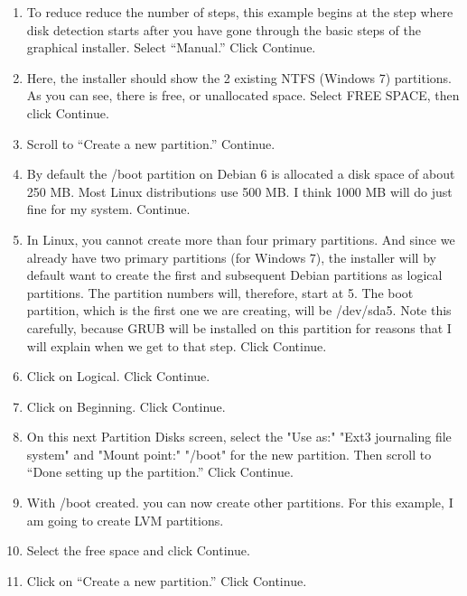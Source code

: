 \documentclass[12pt,notitlepage,onecolumn,oneside,openany]{memoir}
\begin{document}
\begin{enumerate}
\item \textsf{To reduce reduce the number of steps, this example begins at the step where disk detection starts after you have gone through the basic steps of the graphical installer. 
Select “Manual.”  Click Continue.}

\item \textsf{Here, the installer should show the 2 existing NTFS (Windows 7) partitions. As you can see, there is free, or unallocated space. Select FREE SPACE, then click Continue.}

\item \textsf{Scroll to “Create a new partition.” Continue.} 

\item \textsf{By default the /boot partition on Debian 6 is allocated a disk space of about 250 MB. Most Linux distributions use 500 MB. I think 1000 MB will do just fine for my system. Continue.}

\item \textsf{In Linux, you cannot create more than four primary partitions. And since we already have two primary partitions (for Windows 7), the installer will by default want to create the first and subsequent Debian partitions as logical partitions. The partition numbers will, therefore, start at 5. The boot partition, which is the first one we are creating, will be /dev/sda5. Note this carefully, because GRUB will be installed on this partition for reasons that I will explain when we get to that step. Click Continue.}

\item \textsf{Click on Logical. Click Continue.}

\item \textsf{Click on Beginning. Click Continue.} 

\item \textsf{On this next Partition Disks screen, select the "Use as:" "Ext3 journaling file system" and "Mount point:" "/boot" for the new partition. Then scroll to “Done setting up the partition.” Click Continue.}

\item \textsf{With /boot created. you can now create other partitions. For this example, I am going to create LVM partitions.}
 
\item \textsf{Select the free space and click Continue.}
 
\item \textsf{Click on “Create a new partition.” Click Continue.} 


\end{enumerate}
\end{document}
